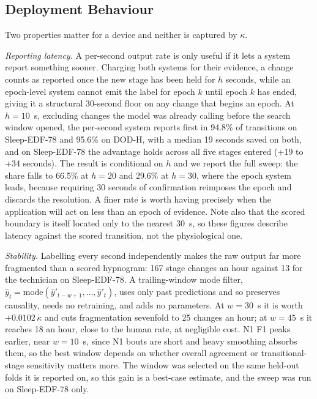 \documentclass[conference]{IEEEtran}
\begin{document}
\subsection{Deployment Behaviour}

Two properties matter for a device and neither is captured by $\kappa$.

\emph{Reporting latency.} A per-second output rate is only useful if it lets a system report
something sooner. Charging both systems for their evidence, a change counts as reported once the
new stage has been held for $h$ seconds, while an epoch-level system cannot emit the label for
epoch $k$ until epoch $k$ has ended, giving it a structural 30-second floor on any change that
begins an epoch. At $h = 10$~s, excluding changes the model was already calling before the search
window opened, the per-second system reports first in 94.8\% of transitions on Sleep-EDF-78 and
95.6\% on DOD-H, with a median 19 seconds saved on both, and on Sleep-EDF-78 the advantage holds
across all five stages entered (+19 to +34 seconds). The result is conditional on $h$ and we report
the full sweep: the share falls to 66.5\% at $h = 20$ and 29.6\% at $h = 30$, where the epoch
system leads, because requiring 30 seconds of confirmation reimposes the epoch and discards the
resolution. A finer rate is worth having precisely when the application will act on less than an
epoch of evidence. Note also that the scored boundary is itself located only to the nearest 30~s,
so these figures describe latency against the scored transition, not the physiological one.

\emph{Stability.} Labelling every second independently makes the raw output far more fragmented
than a scored hypnogram: 167 stage changes an hour against 13 for the technician on Sleep-EDF-78. A
trailing-window mode filter, $\hat{y}_t = \mathrm{mode}(\hat{y}'_{t-w+1},\dots,\hat{y}'_t)$, uses
only past predictions and so preserves causality, needs no retraining, and adds no parameters. At
$w = 30$~s it is worth $+0.0102\,\kappa$ and cuts fragmentation sevenfold to 25 changes an hour; at
$w = 45$~s it reaches 18 an hour, close to the human rate, at negligible cost. N1 F1 peaks earlier,
near $w = 10$~s, since N1 bouts are short and heavy smoothing absorbs them, so the best window
depends on whether overall agreement or transitional-stage sensitivity matters more. The window was
selected on the same held-out folds it is reported on, so this gain is a best-case estimate, and
the sweep was run on Sleep-EDF-78 only.
\end{document}
